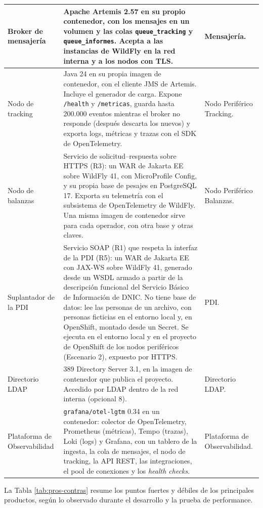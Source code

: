 \begin{longtable}{|p{3.3cm}|p{5.4cm}|p{6.8cm}|}
    \hline
    Broker de mensajería & Apache Artemis 2.57 en su propio contenedor, con los mensajes en un volumen y las colas \texttt{queue\_tracking} y \texttt{queue\_informes}. Acepta a las instancias de WildFly en la red interna y a los nodos con TLS. & Mensajería. \\
    \hline
    Nodo de tracking & Java 24 en su propia imagen de contenedor, con el cliente JMS de Artemis. Incluye el generador de carga. Expone \texttt{/health} y \texttt{/metricas}, guarda hasta 200.000 eventos mientras el broker no responde (después descarta los nuevos) y exporta logs, métricas y trazas con el SDK de OpenTelemetry. & Nodo Periférico Tracking. \\
    \hline
    Nodo de balanzas & Servicio de solicitud--respuesta sobre HTTPS (R3): un WAR de Jakarta EE sobre WildFly 41, con MicroProfile Config, y su propia base de pesajes en PostgreSQL 17. Exporta su telemetría con el subsistema de OpenTelemetry de WildFly. Una misma imagen de contenedor sirve para cada operador, con otra base y otras claves. & Nodo Periférico Balanzas. \\
    \hline
    Suplantador de la PDI & Servicio SOAP (R1) que respeta la interfaz de la PDI (R5): un WAR de Jakarta EE con JAX-WS sobre WildFly 41, generado desde un WSDL armado a partir de la descripción funcional del Servicio Básico de Información de DNIC. No tiene base de datos: lee las personas de un archivo, con personas ficticias en el entorno local y, en OpenShift, montado desde un Secret. Se ejecuta en el entorno local y en el proyecto de OpenShift de los nodos periféricos (Escenario 2), expuesto por HTTPS. & PDI. \\
    \hline
    Directorio LDAP & 389 Directory Server 3.1, en la imagen de contenedor que publica el proyecto. Accedido por LDAP dentro de la red interna (opcional 8). & Directorio LDAP. \\
    \hline
    Plataforma de Observabilidad & \texttt{grafana/otel-lgtm} 0.34 en un contenedor: colector de OpenTelemetry, Prometheus (métricas), Tempo (trazas), Loki (logs) y Grafana, con un tablero de la ingesta, la cola de mensajes, el nodo de tracking, la API REST, las integraciones, el pool de conexiones y los \emph{health checks}. & Plataforma de Observabilidad. \\
    \hline
\end{longtable}

La Tabla \ref{tab:pros-contras} resume los puntos fuertes y débiles de los principales productos, según lo observado durante el desarrollo y la prueba de performance.

